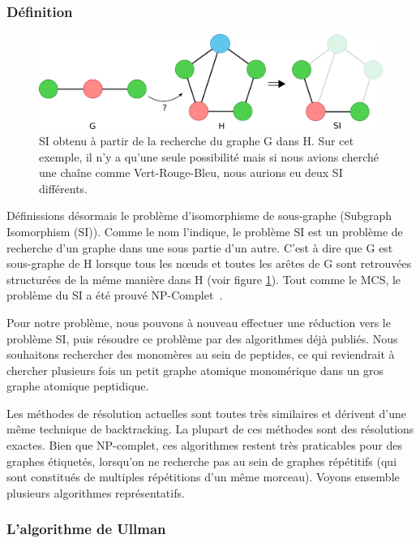 \label{SI_p}

\subsubsection{Définition}

\begin{figure}[!ht]
  \begin{center}
    \includegraphics[width=450px]{Figures/s2m/MCS-SI/si.png}
    \caption{\label{SI_fig}SI obtenu à partir de la recherche du graphe G dans H.
    Sur cet exemple, il n'y a qu'une seule possibilité mais si nous avions cherché une chaîne comme Vert-Rouge-Bleu, nous aurions eu deux SI différents.}
  \end{center}
\end{figure}

Définissions désormais le problème d'isomorphisme de sous-graphe (Subgraph Isomorphism (SI)).
Comme le nom l'indique, le problème SI est un problème de recherche d'un graphe dans une sous partie d'un autre.
C'est à dire que G est sous-graphe de H lorsque tous les n\oe{}uds et toutes les arêtes de G sont retrouvées structurées de la même manière dans H (voir figure \ref{SI_fig}).
Tout comme le MCS, le problème du SI a été prouvé NP-Complet~\cite{garey_computers_1979}.

Pour notre problème, nous pouvons à nouveau effectuer une réduction vers le problème SI, puis résoudre ce problème par des algorithmes déjà publiés.
Nous souhaitons rechercher des monomères au sein de peptides, ce qui reviendrait à chercher plusieurs fois un petit graphe atomique monomérique dans un gros graphe atomique peptidique.

Les méthodes de résolution actuelles sont toutes très similaires et dérivent d'une même technique de backtracking.
La plupart de ces méthodes sont des résolutions exactes.
Bien que NP-complet, ces algorithmes restent très praticables pour des graphes étiquetés, lorsqu'on ne recherche pas au sein de graphes répétitifs (qui sont constitués de multiples répétitions d'un même morceau).
Voyons ensemble plusieurs algorithmes représentatifs.


\subsubsection{L'algorithme de Ullman}

